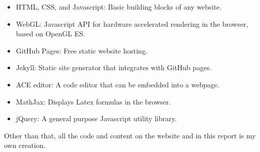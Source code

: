 \documentclass[parskip=half]{scrartcl}
\begin{document}
\begin{itemize}
    \item HTML, CSS, and Javascript: Basic building blocks of any website.
    \item WebGL: Javascript API for hardware accelerated rendering in the
        browser, based on OpenGL ES.
    \item GitHub Pages: Free static website hosting.
    \item Jekyll: Static site generator that integrates with GitHub pages.
    \item ACE editor: A code editor that can be embedded into a webpage.
    \item MathJax: Displays Latex formulas in the browser.
    \item jQuery: A general purpose Javascript utility library.
\end{itemize}

Other than that, all the code and content on the website and in this report is
my own creation.

\nocite{*}
\printbibliography
\end{document}
